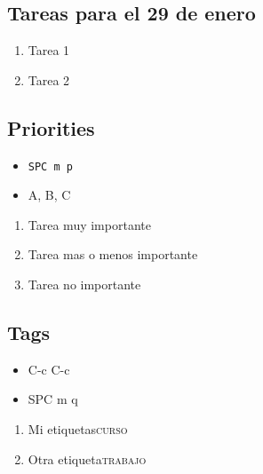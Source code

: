 \documentclass[11pt]{article}
\begin{document}
\subsection{Tareas para el 29 de enero}
\label{sec:orgb809db7}
\begin{enumerate}
\item Tarea 1
\label{sec:orgbb36087}
\item Tarea 2
\label{sec:org9eaf0f5}
\end{enumerate}

\subsection{Priorities}
\label{sec:org73a5842}
\begin{itemize}
\item \texttt{SPC m p}
\item A, B, C
\end{itemize}

\begin{enumerate}
\item Tarea muy importante
\label{sec:orga2d22d3}
\item Tarea mas o menos importante
\label{sec:orga17a4e6}
\item Tarea no importante
\label{sec:orgeb08ba5}
\end{enumerate}

\subsection{Tags}
\label{sec:orgd89e3c3}
\begin{itemize}
\item C-c C-c
\item SPC m q
\end{itemize}

\begin{enumerate}
\item Mi etiquetas\hfill{}\textsc{curso}
\label{sec:org6d45981}
\item Otra etiqueta\hfill{}\textsc{trabajo}
\label{sec:org0d34008}
\end{enumerate}
\end{document}
